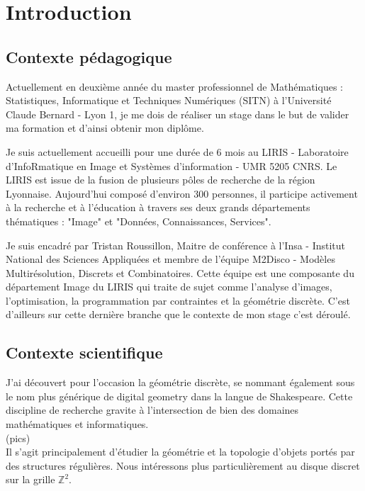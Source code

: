 \section{Introduction}

\subsection{Contexte pédagogique}

Actuellement en deuxième année du master professionnel de Mathématiques : Statistiques, Informatique et Techniques Numériques (SITN) à l’Université Claude Bernard - Lyon 1, je me dois de réaliser un stage dans le but de valider ma formation et d'ainsi obtenir mon diplôme. \newline

Je suis actuellement accueilli pour une durée de 6 mois au LIRIS - Laboratoire d'InfoRmatique en Image et Systèmes d'information - UMR 5205 CNRS. Le LIRIS est issue de la fusion de plusieurs pôles de recherche de la région Lyonnaise. Aujourd'hui composé d'environ 300 personnes, il participe activement à la recherche et à l'éducation à travers ses deux grands départements thématiques : "Image" et "Données, Connaissances, Services".\newline

Je suis encadré par Tristan Roussillon, Maitre de conférence à l'Insa - Institut National des Sciences Appliquées et membre de l'équipe M2Disco - Modèles Multirésolution, Discrets et Combinatoires. Cette équipe est une composante du département Image du LIRIS qui traite de sujet comme l'analyse d'images, l'optimisation, la programmation par contraintes et la géométrie discrète. C'est d'ailleurs sur cette dernière branche que le contexte de mon stage c'est déroulé.



\subsection{Contexte scientifique}

J'ai découvert pour l’occasion la géométrie discrète, se nommant également sous le nom plus générique de digital geometry dans la langue de Shakespeare. Cette discipline de recherche gravite à l'intersection de bien des domaines mathématiques et informatiques.\\

(pics)\\

Il s'agit principalement d'étudier la géométrie et la topologie d'objets portés par des structures régulières. Nous intéressons plus particulièrement au disque discret sur la grille $\mathbb{Z}^{2}$. 
